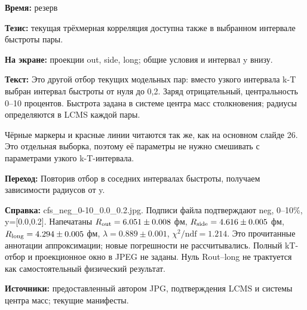 \textbf{Время:} резерв

\textbf{Тезис:} текущая трёхмерная корреляция доступна также в выбранном интервале быстроты пары.

\textbf{На экране:} проекции out, side, long; общие условия и интервал y внизу.

\textbf{Текст:} Это другой отбор текущих модельных пар: вместо узкого интервала k-T выбран интервал быстроты от нуля до 0,2. Заряд отрицательный, центральность 0–10 процентов. Быстрота задана в системе центра масс столкновения; радиусы определяются в LCMS каждой пары.

Чёрные маркеры и красные линии читаются так же, как на основном слайде 26. Это отдельная выборка, поэтому её параметры не нужно смешивать с параметрами узкого k-T-интервала.

\textbf{Переход:} Повторив отбор в соседних интервалах быстроты, получаем зависимости радиусов от y.

\textbf{Справка:} cfs\_neg\_0-10\_0.0\_0.2.jpg. Подписи файла подтверждают neg, 0–10\%, y=[0.0,0.2]. Напечатаны \(R_{\rm out}=6.051\pm0.008\) фм, \(R_{\rm side}=4.616\pm0.005\) фм, \(R_{\rm long}=4.294\pm0.005\) фм, \(\lambda=0.889\pm0.001\), \(\chi^2/\mathrm{ndf}=1.214\). Это прочитанные аннотации аппроксимации; новые погрешности не рассчитывались. Полный kT-отбор и проекционное окно в JPEG не заданы. Нуль Rout–long не трактуется как самостоятельный физический результат.

\textbf{Источники:} предоставленный автором JPG, подтверждения LCMS и системы центра масс; текущие манифесты.
